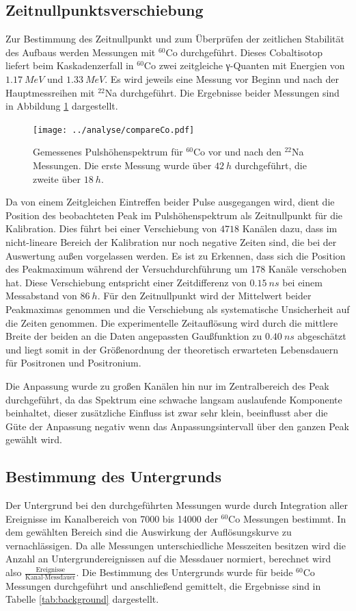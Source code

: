 \documentclass[a4paper,12pt]{article}
\begin{document}
\FloatBarrier
\subsection{Zeitnullpunktsverschiebung}\label{cap:zeitverschiebung}

Zur Bestimmung des Zeitnullpunkt und zum Überprüfen der zeitlichen Stabilität des Aufbaus werden Messungen mit
$^{60}$Co durchgeführt.
Dieses Cobaltisotop liefert beim Kaskadenzerfall in $^{60}$Co zwei zeitgleiche γ-Quanten mit Energien von $\SI{1.17}{MeV}$ und $\SI{1.33}{MeV}$. Es wird jeweils eine Messung vor Beginn
und nach der Hauptmessreihen mit $^{22}$Na durchgeführt. Die Ergebnisse beider Messungen sind in Abbildung \ref{fig:compare_co} dargestellt.

\begin{figure}
	\texttt{[image: ../analyse/compareCo.pdf]}
	\caption{Gemessenes Pulshöhenspektrum für $^{60}$Co vor und nach den $^{22}$Na Messungen. Die
	erste Messung wurde über $\SI{42}{h}$ durchgeführt, die zweite über $\SI{18}{h}$.}
	\label{fig:compare_co}
\end{figure}

Da von einem Zeitgleichen Eintreffen beider Pulse ausgegangen wird, dient die Position des
beobachteten Peak im Pulshöhenspektrum als Zeitnullpunkt für die Kalibration.
Dies führt bei einer Verschiebung von $4718$ Kanälen dazu, dass im nicht-lineare Bereich der
Kalibration nur noch negative Zeiten sind, die bei der Auswertung außen vorgelassen werden.
Es ist zu Erkennen, dass sich die Position des Peakmaximum während der Versuchdurchführung um 178 Kanäle verschoben hat. Diese Verschiebung entspricht einer
Zeitdifferenz von $\SI{0.15}{ns}$ bei einem Messabstand von $\SI{86}{h}$.
Für den Zeitnullpunkt wird der Mittelwert beider Peakmaximas genommen und die Verschiebung als
systematische Unsicherheit auf die Zeiten genommen.
Die experimentelle Zeitauflösung wird durch die mittlere Breite der beiden an die
Daten angepassten Gaußfunktion zu $\SI{0.40}{ns}$ abgeschätzt und liegt somit in der Größenordnung der theoretisch erwarteten Lebensdauern für Positronen und Positronium.

Die Anpassung wurde zu großen Kanälen hin nur im Zentralbereich des Peak durchgeführt, da das Spektrum eine schwache langsam auslaufende Komponente beinhaltet,
dieser zusätzliche Einfluss ist zwar sehr klein, beeinflusst aber die Güte der Anpassung negativ wenn das Anpassungsintervall über den ganzen Peak gewählt wird.
\subsection{Bestimmung des Untergrunds}
Der Untergrund bei den durchgeführten Messungen wurde durch Integration aller Ereignisse im Kanalbereich von 7000 bis 14000 der $^{60}$Co Messungen bestimmt. 
In dem gewählten Bereich sind die Auswirkung der Auflösungskurve zu vernachlässigen. Da alle
Messungen unterschiedliche Messzeiten besitzen wird die Anzahl
an Untergrundereignissen auf die Messdauer normiert, berechnet wird also
$\frac{\text{Ereignisse}}{\text{Kanal}\cdot \text{Messdauer}}$. Die Bestimmung des Untergrunds wurde für beide
 $^{60}$Co Messungen durchgeführt und anschließend gemittelt, die Ergebnisse sind in Tabelle \ref{tab:background} dargestellt.
\end{document}
